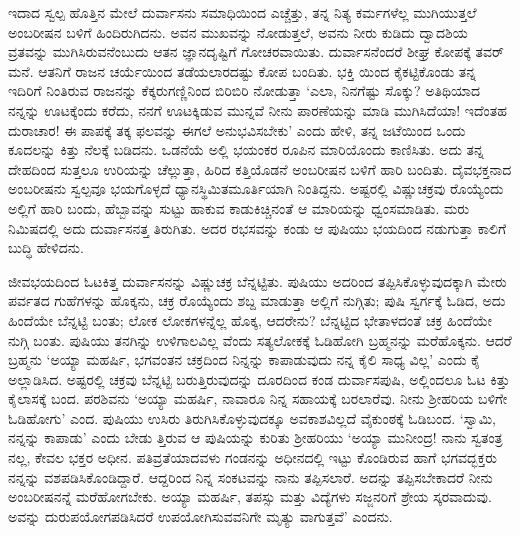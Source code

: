 ಇದಾದ ಸ್ವಲ್ಪ ಹೊತ್ತಿನ ಮೇಲೆ ದುರ್ವಾಸನು ಸಮಾಧಿಯಿಂದ ಎಚ್ಚೆತ್ತು, ತನ್ನ ನಿತ್ಯ ಕರ್ಮಗಳೆಲ್ಲ ಮುಗಿಯುತ್ತಲೆ ಅಂಬರೀಷನ ಬಳಿಗೆ ಹಿಂದಿರುಗಿದನು. ಅವನ ಮುಖವನ್ನು ನೋಡುತ್ತಲೆ, ಅವನು ನೀರು ಕುಡಿದು ದ್ವಾದಶಿಯ ವ್ರತವನ್ನು ಮುಗಿಸಿರುವನೆಂಬುದು ಆತನ ಜ್ಞಾನದೃಷ್ಟಿಗೆ ಗೋಚರವಾಯಿತು. ದುರ್ವಾಸನೆಂದರೆ ಶೀಘ್ರ ಕೋಪಕ್ಕೆ ತವರ್ ಮನೆ. ಆತನಿಗೆ ರಾಜನ ಚರ್ಯೆಯಿಂದ ತಡೆಯಲಾರದಷ್ಟು ಕೋಪ ಬಂದಿತು. ಭಕ್ತಿ ಯಿಂದ ಕೈಕಟ್ಟಿಕೊಂಡು ತನ್ನ ಇದಿರಿಗೆ ನಿಂತಿರುವ ರಾಜನನ್ನು ಕೆಕ್ಕರುಗಣ್ಣಿನಿಂದ ಬಿರಿಬಿರಿ ನೋಡುತ್ತಾ ‘ಎಲಾ, ನಿನಗೆಷ್ಟು ಸೊಕ್ಕು? ಅತಿಥಿಯಾದ ನನ್ನನ್ನು ಊಟಕ್ಕೆಂದು ಕರೆದು, ನನಗೆ ಊಟಕ್ಕಿಡುವ ಮುನ್ನವೆ ನೀನು ಪಾರಣೆಯನ್ನು ಮಾಡಿ ಮುಗಿಸಿದೆಯಾ! ಇದೆಂತಹ ದುರಾಚಾರ! ಈ ಪಾಪಕ್ಕೆ ತಕ್ಕ ಫಲವನ್ನು ಈಗಲೆ ಅನುಭವಿಸಬೇಕು’ ಎಂದು ಹೇಳಿ, ತನ್ನ ಜಟೆಯಿಂದ ಒಂದು ಕೂದಲನ್ನು ಕಿತ್ತು ನೆಲಕ್ಕೆ ಬಡಿದನು. ಒಡನೆಯೆ ಅಲ್ಲಿ ಭಯಂಕರ ರೂಪಿನ ಮಾರಿಯೊಂದು ಕಾಣಿಸಿತು. ಅದು ತನ್ನ ದೇಹದಿಂದ ಸುತ್ತಲೂ ಉರಿಯನ್ನು ಚೆಲ್ಲುತ್ತಾ, ಹಿರಿದ ಕತ್ತಿಯೊಡನೆ ಅಂಬರೀಷನ ಬಳಿಗೆ ಹಾರಿ ಬಂದಿತು. ದೈವಭಕ್ತನಾದ ಅಂಬರೀಷನು ಸ್ವಲ್ಪವೂ ಭಯಗೊಳ್ಳದೆ ಧ್ಯಾನಸ್ಥಿಮಿತಮೂರ್ತಿಯಾಗಿ ನಿಂತಿದ್ದನು. ಅಷ್ಟರಲ್ಲಿ ವಿಷ್ಣುಚಕ್ರವು ರೊಯ್ಯೆಂದು ಅಲ್ಲಿಗೆ ಹಾರಿ ಬಂದು, ಹೆಬ್ಬಾವನ್ನು ಸುಟ್ಟು ಹಾಕುವ ಕಾಡುಕಿಚ್ಚಿನಂತೆ ಆ ಮಾರಿಯನ್ನು ಧ್ವಂಸಮಾಡಿತು. ಮರು ನಿಮಿಷದಲ್ಲಿ ಅದು ದುರ್ವಾಸನತ್ತ ತಿರುಗಿತು. ಅದರ ರಭಸವನ್ನು ಕಂಡು ಆ ಪುಷಿಯು ಭಯದಿಂದ ನಡುಗುತ್ತಾ ಕಾಲಿಗೆ ಬುದ್ಧಿ ಹೇಳಿದನು.

ಜೀವಭಯದಿಂದ ಓಟಕಿತ್ತ ದುರ್ವಾಸನನ್ನು ವಿಷ್ಣುಚಕ್ರ ಬೆನ್ನಟ್ಟಿತು. ಪುಷಿಯು ಅದರಿಂದ ತಪ್ಪಿಸಿಕೊಳ್ಳುವುದಕ್ಕಾಗಿ ಮೇರು ಪರ್ವತದ ಗುಹೆಗಳನ್ನು ಹೊಕ್ಕನು, ಚಕ್ರ ರೊಯ್ಯೆಂದು ಶಬ್ದ ಮಾಡುತ್ತಾ ಅಲ್ಲಿಗೆ ನುಗ್ಗಿತು; ಪುಷಿ ಸ್ವರ್ಗಕ್ಕೆ ಓಡಿದ, ಅದು ಹಿಂದೆಯೇ ಬೆನ್ನಟ್ಟಿ ಬಂತು; ಲೋಕ ಲೋಕಗಳನ್ನೆಲ್ಲ ಹೊಕ್ಕ, ಆದರೇನು? ಬೆನ್ನಟ್ಟಿದ ಭೇತಾಳದಂತೆ ಚಕ್ರ ಹಿಂದೆಯೇ ನುಗ್ಗಿ ಬಂತು. ಪುಷಿಯು ತನಗಿನ್ನು ಉಳಿಗಾಲವಿಲ್ಲ ವೆಂದು ಸತ್ಯಲೋಕಕ್ಕೆ ಓಡಿಹೋಗಿ ಬ್ರಹ್ಮನನ್ನು ಮರೆಹೊಕ್ಕನು. ಆದರೆ ಬ್ರಹ್ಮನು ‘ಅಯ್ಯಾ ಮಹರ್ಷಿ, ಭಗವಂತನ ಚಕ್ರದಿಂದ ನಿನ್ನನ್ನು ಕಾಪಾಡುವುದು ನನ್ನ ಕೈಲಿ ಸಾಧ್ಯ ವಿಲ್ಲ’ ಎಂದು ಕೈ ಅಲ್ಲಾಡಿಸಿದ. ಅಷ್ಟರಲ್ಲಿ ಚಕ್ರವು ಬೆನ್ನಟ್ಟಿ ಬರುತ್ತಿರುವುದನ್ನು ದೂರದಿಂದ ಕಂಡ ದುರ್ವಾಸಪುಷಿ, ಅಲ್ಲಿಂದಲೂ ಓಟ ಕಿತ್ತು ಕೈಲಾಸಕ್ಕೆ ಬಂದ. ಪರಶಿವನು ‘ಅಯ್ಯಾ ಮಹರ್ಷಿ, ನಾವಾರೂ ನಿನ್ನ ಸಹಾಯಕ್ಕೆ ಬರಲಾರೆವು. ನೀನು ಶ್ರೀಹರಿಯ ಬಳಿಗೇ ಓಡಿಹೋಗು’ ಎಂದ. ಪುಷಿಯು ಉಸಿರು ತಿರುಗಿಸಿಕೊಳ್ಳುವುದಕ್ಕೂ ಅವಕಾಶವಿಲ್ಲದೆ ವೈಕುಂಠಕ್ಕೆ ಓಡಿಬಂದ. ‘ಸ್ವಾಮಿ, ನನ್ನನ್ನು ಕಾಪಾಡು’ ಎಂದು ಬೇಡು ತ್ತಿರುವ ಆ ಪುಷಿಯನ್ನು ಕುರಿತು ಶ್ರೀಹರಿಯು ‘ಅಯ್ಯಾ ಮುನೀಂದ್ರ! ನಾನು ಸ್ವತಂತ್ರ ನಲ್ಲ, ಕೇವಲ ಭಕ್ತರ ಅಧೀನ. ಪತಿವ್ರತೆಯಾದವಳು ಗಂಡನನ್ನು ಅಧೀನದಲ್ಲಿ ಇಟ್ಟು ಕೊಂಡಿರುವ ಹಾಗೆ ಭಗವದ್ಭಕ್ತರು ನನ್ನನ್ನು ವಶಪಡಿಸಿಕೊಂಡಿದ್ದಾರೆ. ಆದ್ದರಿಂದ ನಿನ್ನ ಸಂಕಟವನ್ನು ನಾನು ತಪ್ಪಿಸಲಾರೆ. ಅದನ್ನು ತಪ್ಪಿಸಬೇಕಾದರೆ ನೀನು ಅಂಬರೀಷನನ್ನೆ ಮರೆಹೋಗಬೇಕು. ಅಯ್ಯಾ ಮಹರ್ಷಿ, ತಪಸ್ಸು ಮತ್ತು ವಿದ್ಯೆಗಳು ಸಜ್ಜನರಿಗೆ ಶ್ರೇಯ ಸ್ಕರವಾದುವು. ಅವನ್ನು ದುರುಪಯೋಗಪಡಿಸಿದರೆ ಉಪಯೋಗಿಸುವವನಿಗೇ ಮೃತ್ಯು ವಾಗುತ್ತವೆ’ ಎಂದನು.

